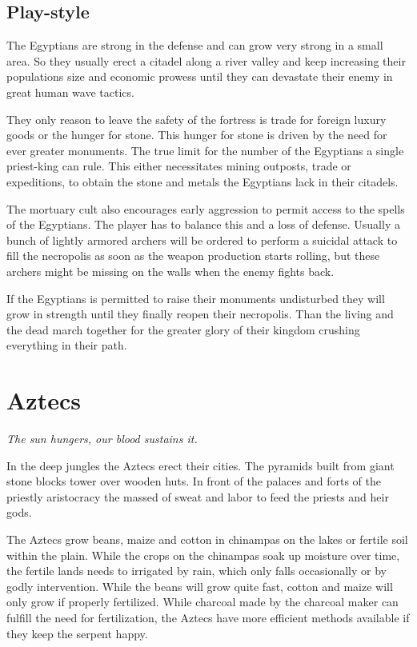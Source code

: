 \documentclass[a4paper]{book}
\begin{document}
	\subsection{Play-style}
		The \gls{Egyptians} are strong in the defense and can grow very strong in a small area.
		So they usually erect a citadel along a river valley and keep increasing
		their populations size and economic prowess until they can devastate their enemy 
		in great human wave tactics.

		They only reason to leave the safety of the fortress is trade for foreign luxury
		goods or the hunger for stone.
		This hunger for stone is driven by the need for ever greater monuments.
		The true limit for the number of the \gls{Egyptians} a single priest-king
		can rule.
		This either necessitates mining outposts, trade or expeditions,
		to obtain the stone and metals the \gls{Egyptians} lack in their citadels.

		The mortuary cult also encourages early aggression to permit access to the
		spells of the \gls{Egyptians}.
		The player has to balance this and a loss of defense.
		Usually a bunch of lightly armored archers will be ordered to perform
		a suicidal attack to fill the necropolis as soon as the weapon production
		starts rolling,
		but these archers might be missing on the walls when the enemy fights back.

		If the \gls{Egyptians} is permitted to raise their monuments undisturbed
		they will grow in strength until they finally reopen their necropolis.
		Than the living and the dead march together for the greater glory
		of their kingdom crushing everything in their path.

\section{\Gls{Aztecs}}

	\begin{flushright}
		\emph{The sun hungers, our blood sustains it.}
	\end{flushright}

	In the deep jungles the \gls{Aztecs} erect their cities.
	The pyramids built from giant stone blocks tower over wooden huts.
	In front of the palaces and forts of the priestly aristocracy the massed of sweat 
	and labor to feed the priests and heir gods.

	The \gls{Aztecs} grow beans, maize and cotton in chinampas on the lakes or fertile soil within the plain.
	While the crops on the chinampas soak up moisture over time,
	the fertile lands needs to irrigated by rain, which only falls occasionally or by godly intervention.
	While the beans will grow quite fast, cotton and maize will only grow if properly fertilized.
	While charcoal made by the charcoal maker can fulfill the need for fertilization,
	the \gls{Aztecs} have more efficient methods available if they keep the serpent happy.
\end{document}
